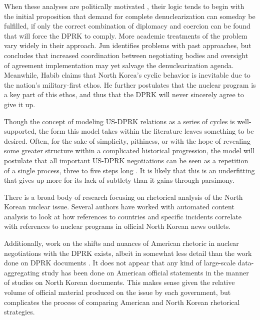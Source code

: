 When these analyses are politically motivated \cite{blair, cfr}, their logic tends to begin with the initial proposition that demand for complete denuclearization can someday be fulfilled, if only the correct combination of diplomacy and coercion can be found that will force the DPRK to comply. More academic treatments of the problem \cite{habib,jun} vary widely in their approach. Jun \cite{jun} identifies problems with past approaches, but concludes that increased coordination between negotiating bodies and oversight of agreement implementation may yet salvage the denuclearization agenda. Meanwhile, Habib \cite{habib} claims that North Korea's cyclic behavior is inevitable due to the nation's military-first ethos. He further postulates that the nuclear program is a key part of this ethos, and thus that the DPRK will never sincerely agree to give it up.

Though the concept of modeling US-DPRK relations as a series of cycles is well-supported, the form this model takes within the literature leaves something to be desired. Often, for the sake of simplicity, pithiness, or with the hope of revealing some greater structure within a complicated historical progression, the model will postulate that all important US-DPRK negotiations can be seen as a repetition of a single process, three to five steps long \cite{fisher,jun}. It is likely that this is an underfitting that gives up more for its lack of subtlety than it gains through parsimony.

There is a broad body of research focusing on rhetorical analysis of the North Korean nuclear issue. Several authors \cite{rich12, rich14, sin} have worked with automated content analysis to look at how references to countries and specific incidents correlate with references to nuclear programs in official North Korean news outlets.

Additionally, work on the shifts and nuances of American rhetoric in nuclear negotiations with the DPRK exists, albeit in somewhat less detail than the work done on DPRK documents \cite{bleiker,cumings,harnisch,huntley}. It does not appear that any kind of large-scale data-aggregating study has been done on American official statements in the manner of studies on North Korean documents. This makes sense given the relative volume of official material produced on the issue by each government, but complicates the process of comparing American and North Korean rhetorical strategies.